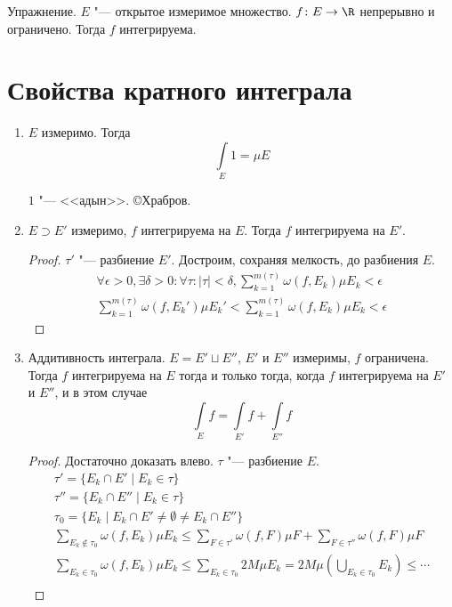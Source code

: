 Упражнение. $E$ "--- открытое измеримое множество.
$f\colon E \to \R$ непрерывно и ограничено.
Тогда $f$ интегрируема.

\section{Свойства кратного интеграла}

\begin{enumerate}
\item
	$E$ измеримо.
	Тогда
	\[ \int\limits_E 1 = \mu E \]
	\begin{Rem}
		$1$ "--- <<адын>>. \copyright Храбров.
	\end{Rem}

\item
	$E \supset E'$ измеримо, $f$ интегрируема на $E$.
	Тогда $f$ интегрируема на $E'$.
	\begin{proof}
		$\tau'$ "--- разбиение $E'$. Достроим, сохраняя мелкость, до разбиения $E$.
		\begin{gather*}
			\forall \epsilon > 0, \exists \delta > 0\colon \forall \tau\colon |\tau| < \delta,
				\sum_{k=1}^{m(\tau)} \omega(f, E_k) \mu E_k < \epsilon \\
			\sum_{k=1}^{m(\tau)} \omega(f, E_k') \mu E_k' < \sum_{k=1}^{m(\tau)} \omega(f, E_k) \mu E_k < \epsilon
		\end{gather*}
	\end{proof}

\item
	Аддитивность интеграла.
	$E = E' \sqcup E''$, $E'$ и $E''$ измеримы, $f$ ограничена.
	Тогда $f$ интегрируема на $E$ тогда и только тогда, когда $f$ интегрируема на $E'$ и $E''$, и в этом случае
	\[ \int\limits_E f = \int\limits_{E'} f + \int\limits_{E''} f \]
	\begin{proof}
		Достаточно доказать влево. $\tau$ "--- разбиение $E$.
		\begin{gather*}
			\tau' = \{E_k \cap E' \mid E_k \in \tau\} \\
			\tau'' = \{E_k \cap E'' \mid E_k \in \tau\} \\
			\tau_0 = \{E_k \mid E_k \cap E' \ne \emptyset \ne E_k \cap E''\} \\
			\sum_{E_k \notin \tau_0} \omega(f, E_k) \mu E_k
				\le \sum_{F \in \tau'} \omega(f, F) \mu F + \sum_{F \in \tau''} \omega(f, F) \mu F \\
			\sum_{E_k \in \tau_0} \omega(f, E_k) \mu E_k
				\le \sum_{E_k \in \tau_0} 2M \mu E_k = 2M \mu \left( \bigcup_{E_k \in \tau_0} E_k \right) \le \cdots \\
		\end{gather*}


\end{proof}
\end{enumerate}
